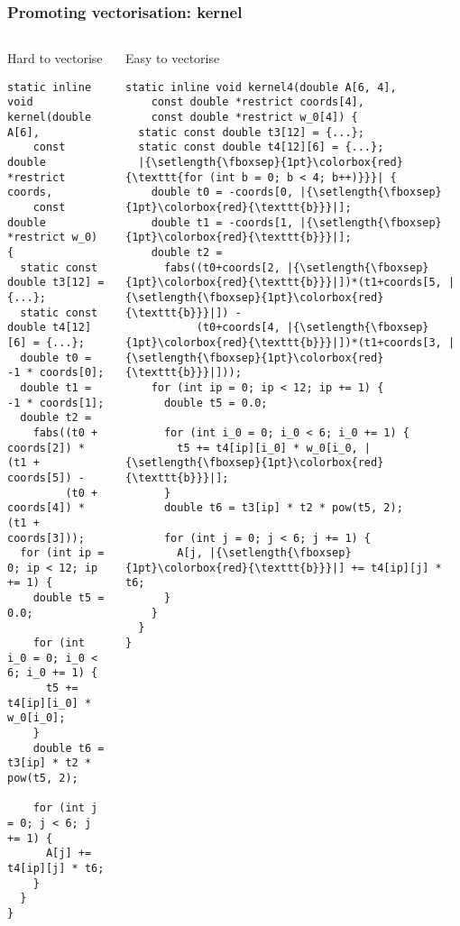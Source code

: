 \documentclass[presentation,aspectratio=43,10pt]{beamer}
\begin{document}
\begin{frame}[fragile]
  \frametitle{Promoting vectorisation: kernel}
  \begin{columns}[t]
    \begin{column}{0.5\textwidth}
      Hard to vectorise

\begin{verbatim}
static inline void kernel(double A[6],
    const double *restrict coords,
    const double *restrict w_0) {
  static const double t3[12] = {...};
  static const double t4[12][6] = {...};
  double t0 = -1 * coords[0];
  double t1 = -1 * coords[1];
  double t2 =
    fabs((t0 + coords[2]) * (t1 + coords[5]) -
         (t0 + coords[4]) * (t1 + coords[3]));
  for (int ip = 0; ip < 12; ip += 1) {
    double t5 = 0.0;

    for (int i_0 = 0; i_0 < 6; i_0 += 1) {
      t5 += t4[ip][i_0] * w_0[i_0];
    }
    double t6 = t3[ip] * t2 * pow(t5, 2);

    for (int j = 0; j < 6; j += 1) {
      A[j] += t4[ip][j] * t6;
    }
  }
}
\end{verbatim}
    \end{column}
    \begin{column}{0.5\textwidth}
      Easy to vectorise

\begin{verbatim}
static inline void kernel4(double A[6, 4],
    const double *restrict coords[4],
    const double *restrict w_0[4]) {
  static const double t3[12] = {...};
  static const double t4[12][6] = {...};
  |{\setlength{\fboxsep}{1pt}\colorbox{red}{\texttt{for (int b = 0; b < 4; b++)}}}| {
    double t0 = -coords[0, |{\setlength{\fboxsep}{1pt}\colorbox{red}{\texttt{b}}}|];
    double t1 = -coords[1, |{\setlength{\fboxsep}{1pt}\colorbox{red}{\texttt{b}}}|];
    double t2 =
      fabs((t0+coords[2, |{\setlength{\fboxsep}{1pt}\colorbox{red}{\texttt{b}}}|])*(t1+coords[5, |{\setlength{\fboxsep}{1pt}\colorbox{red}{\texttt{b}}}|]) -
           (t0+coords[4, |{\setlength{\fboxsep}{1pt}\colorbox{red}{\texttt{b}}}|])*(t1+coords[3, |{\setlength{\fboxsep}{1pt}\colorbox{red}{\texttt{b}}}|]));
    for (int ip = 0; ip < 12; ip += 1) {
      double t5 = 0.0;

      for (int i_0 = 0; i_0 < 6; i_0 += 1) {
        t5 += t4[ip][i_0] * w_0[i_0, |{\setlength{\fboxsep}{1pt}\colorbox{red}{\texttt{b}}}|];
      }
      double t6 = t3[ip] * t2 * pow(t5, 2);

      for (int j = 0; j < 6; j += 1) {
        A[j, |{\setlength{\fboxsep}{1pt}\colorbox{red}{\texttt{b}}}|] += t4[ip][j] * t6;
      }
    }
  }
}
\end{verbatim}
    \end{column}
  \end{columns}
\end{frame}
\end{document}

